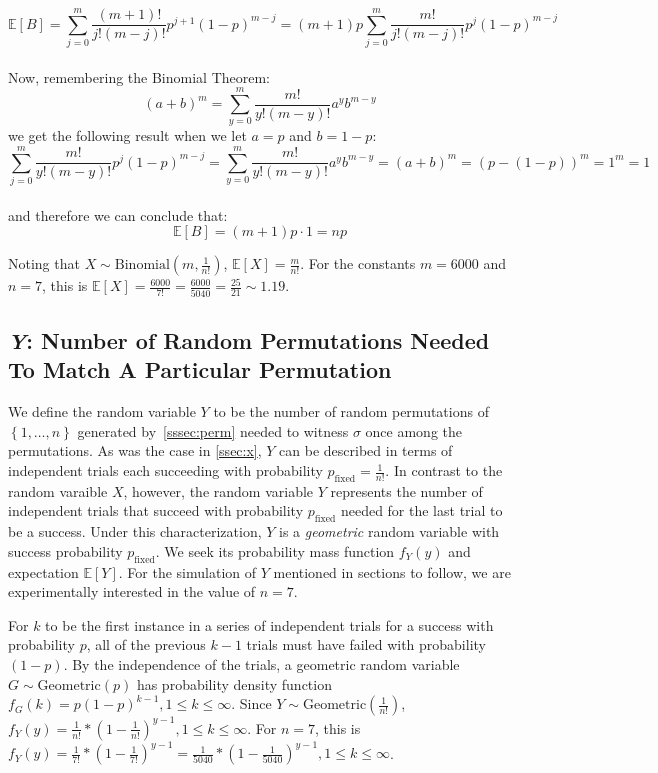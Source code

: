 \documentclass[11pt, oneside]{article}   	%
\begin{document}
$$\mathbb{E}[B]=\sum_{j=0}^{m}\frac{(m+1)!}{j!(m-j)!}p^{j+1}(1-p)^{m-j}=(m+1)p\sum_{j=0}^m\frac{m!}{j!(m-j)!}p^j(1-p)^{m-j}$$\\
Now, remembering the Binomial Theorem:
\begin{equation}
  (a+b)^m=\sum_{y=0}^{m}\frac{m!}{y!(m-y)!}a^yb^{m-y}
  \label{eqn:bt}
\end{equation}
we get the following result when we let $a=p$ and $b=1-p$:\\
\begin{equation*}
  \sum_{j=0}^{m}\frac{m!}{y!(m-y)!}p^j(1-p)^{m-j}=
  \sum_{y=0}^{m}\frac{m!}{y!(m-y)!}a^yb^{m-y}=
  (a+b)^m=(p-(1-p))^m=1^m=1
\end{equation*}\\
and therefore we can conclude that:
$$\mathbb{E}[B]=(m+1)p\cdot 1=np$$

Noting that $X \sim \text{Binomial}(m,\frac{1}{n!})$, $\mathbb{E}[X] = \frac{m}{n!}$. For the constants $m = 6000$ and $n = 7$, this is $\mathbb{E}[X] = \frac{6000}{7!} = \frac{6000}{5040} = \frac{25}{21} \sim 1.19$.

\subsection{\textit{Y}: Number of Random Permutations Needed To Match A Particular Permutation}
We define the random variable $Y$ to be the number of random permutations of $\left\{1, \dots, n\right\}$ generated by~\ref{sssec:perm} needed to witness $\sigma$ once among the permutations. As was the case in \ref{ssec:x}, $Y$ can be described in terms of independent trials each succeeding with probability $p_{\text{fixed}} = \frac{1}{n!}$. In contrast to the random varaible $X$, however, the random variable $Y$ represents the number of independent trials that succeed with probability $p_{\text{fixed}}$ needed for the last trial to be a success. Under this characterization, $Y$ is a \textit{geometric} random variable with success probability $p_{\text{fixed}}$. We seek its probability mass function $f_Y(y)$ and expectation $\mathbb{E}[Y]$. For the simulation of $Y$ mentioned in sections to follow, we are experimentally interested in the value of $n = 7$.

For $k$ to be the first instance in a series of independent trials for a success with probability $p$, all of the previous $k - 1$ trials must have failed with probability $(1 - p)$. By the independence of the trials, a geometric random variable $G \sim \text{Geometric}(p)$ has probability density function $f_G(k) = p(1-p)^{k-1}, 1 \leq k \leq \infty$. Since $Y \sim \text{Geometric}(\frac{1}{n!})$, $f_Y(y) = \frac{1}{n!} * (1 - \frac{1}{n!})^{y-1}, 1 \leq k \leq \infty$. For $n = 7$, this is $f_Y(y) = \frac{1}{7!} * (1 - \frac{1}{7!})^{y-1} = \frac{1}{5040} * (1 - \frac{1}{5040})^{y-1}, 1 \leq k \leq \infty$.
\end{document}
